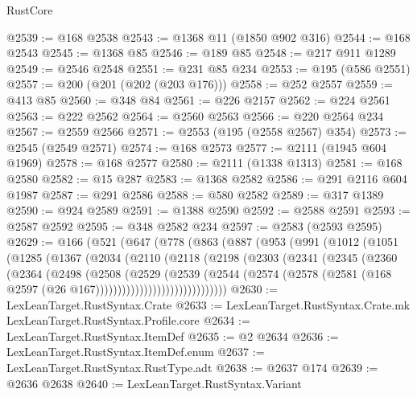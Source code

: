 \begin{lexlean}{RustCore}
\begin{coremodule}
@2539 := @168 @2538
@2543 := @1368 @11 (@1850 @902 @316)
@2544 := @168 @2543
@2545 := @1368 @85
@2546 := @189 @85
@2548 := @217 @911 @1289
@2549 := @2546 @2548
@2551 := @231 @85 @234
@2553 := @195 (@586 @2551)
@2557 := @200 (@201 (@202 (@203 @176)))
@2558 := @252 @2557
@2559 := @413 @85
@2560 := @348 @84
@2561 := @226 @2157
@2562 := @224 @2561
@2563 := @222 @2562
@2564 := @2560 @2563
@2566 := @220 @2564 @234
@2567 := @2559 @2566
@2571 := @2553 (@195 (@2558 @2567) @354)
@2573 := @2545 (@2549 @2571)
@2574 := @168 @2573
@2577 := @2111 (@1945 @604 @1969)
@2578 := @168 @2577
@2580 := @2111 (@1338 @1313)
@2581 := @168 @2580
@2582 := @15 @287
@2583 := @1368 @2582
@2586 := @291 @2116 @604 @1987
@2587 := @291 @2586
@2588 := @580 @2582
@2589 := @317 @1389
@2590 := @924 @2589
@2591 := @1388 @2590
@2592 := @2588 @2591
@2593 := @2587 @2592
@2595 := @348 @2582 @234
@2597 := @2583 (@2593 @2595)
@2629 := @166
    (@521
      (@647
        (@778
          (@863
            (@887
              (@953
                (@991
                  (@1012
                    (@1051
                      (@1285
                        (@1367
                          (@2034
                            (@2110
                              (@2118
                                (@2198
                                  (@2303
                                    (@2341
                                      (@2345
                                        (@2360
                                          (@2364
                                            (@2498
                                              (@2508
                                                (@2529
                                                  (@2539
                                                    (@2544
                                                      (@2574
                                                        (@2578
                                                          (@2581
                                                            (@168
                                                              @2597
                                                              (@26
                                                                @167))))))))))))))))))))))))))))))
@2630 := LexLeanTarget.RustSyntax.Crate
@2633 := LexLeanTarget.RustSyntax.Crate.mk LexLeanTarget.RustSyntax.Profile.core
@2634 := LexLeanTarget.RustSyntax.ItemDef
@2635 := @2 @2634
@2636 := LexLeanTarget.RustSyntax.ItemDef.enum
@2637 := LexLeanTarget.RustSyntax.RustType.adt
@2638 := @2637 @174
@2639 := @2636 @2638
@2640 := LexLeanTarget.RustSyntax.Variant

\end{coremodule}
\end{lexlean}
